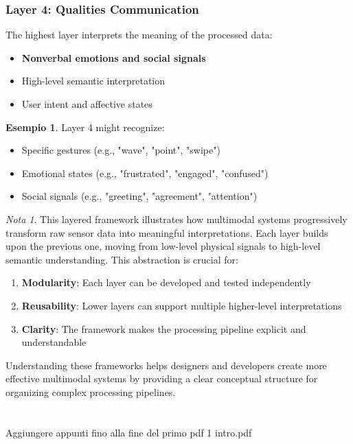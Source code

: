 \documentclass[11pt,a4paper]{article}
\theoremstyle{definition}
\newtheorem{example}{Esempio}[section]
\theoremstyle{plain}
\theoremstyle{remark}
\newtheorem*{remark}{Nota}
\begin{document}
\subsubsection{Layer 4: Qualities Communication}

The highest layer interprets the meaning of the processed data:

\begin{itemize}
    \item \textbf{Nonverbal emotions and social signals}
    \item High-level semantic interpretation
    \item User intent and affective states
\end{itemize}

\begin{example}
Layer 4 might recognize:
\begin{itemize}
    \item Specific gestures (e.g., "wave", "point", "swipe")
    \item Emotional states (e.g., "frustrated", "engaged", "confused")
    \item Social signals (e.g., "greeting", "agreement", "attention")
\end{itemize}
\end{example}

\begin{remark}
This layered framework illustrates how multimodal systems progressively transform raw sensor data into meaningful interpretations. Each layer builds upon the previous one, moving from low-level physical signals to high-level semantic understanding. This abstraction is crucial for:
\begin{enumerate}
    \item \textbf{Modularity}: Each layer can be developed and tested independently
    \item \textbf{Reusability}: Lower layers can support multiple higher-level interpretations
    \item \textbf{Clarity}: The framework makes the processing pipeline explicit and understandable
\end{enumerate}

Understanding these frameworks helps designers and developers create more effective multimodal systems by providing a clear conceptual structure for organizing complex processing pipelines.
\end{remark}



\newpage

\section{}

Aggiungere appunti fino alla fine del primo pdf 1 intro.pdf
\end{document}
